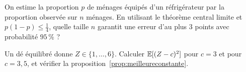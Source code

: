 \begin{exercice}
\label{ex:sondage}
On estime la proportion $p$ de ménages équipés d'un réfrigérateur par la proportion observée sur $n$ ménages.
En utilisant le théorème central limite et $p(1-p)\le\frac14$, quelle taille $n$ garantit une erreur d'au plus $3$ points avec probabilité $95\,\%$ ?
\end{exercice}

\begin{exercice}
\label{ex:meilleureconstante}
Un dé équilibré donne $Z\in\{1,\dots,6\}$. Calculer $\mathbb{E}[(Z-c)^2]$ pour $c=3$ et pour $c=3{,}5$, et vérifier la proposition~\ref{prop:meilleureconstante}.
\end{exercice}
